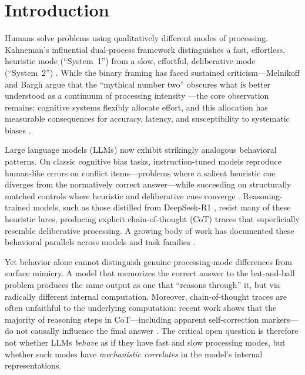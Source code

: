 
\section{Introduction}
\label{sec:introduction}

Humans solve problems using qualitatively different modes of processing.
Kahneman's influential dual-process framework distinguishes a fast, effortless,
heuristic mode (``System~1'') from a slow, effortful, deliberative mode
(``System~2'') \citep{kahneman2011thinking}.  While the binary framing has
faced sustained criticism---Melnikoff and Bargh argue that the ``mythical number
two'' obscures what is better understood as a continuum of processing intensity
\citep{melnikoff2018mythical}---the core observation remains: cognitive systems
flexibly allocate effort, and this allocation has measurable consequences for
accuracy, latency, and susceptibility to systematic biases
\citep{evans2013dual, deneys2012bias}.

Large language models (LLMs) now exhibit strikingly analogous behavioral
patterns.  On classic cognitive bias tasks, instruction-tuned models reproduce
human-like errors on conflict items---problems where a salient heuristic cue
diverges from the normatively correct answer---while succeeding on structurally
matched controls where heuristic and deliberative cues converge
\citep{hagendorff2023human}.  Reasoning-trained models, such as those distilled
from DeepSeek-R1 \citep{deepseekr1}, resist many of these heuristic lures,
producing explicit chain-of-thought (CoT) traces that superficially resemble
deliberative processing.  A growing body of work has documented these behavioral
parallels across models and task families \citep{xie2025cogsci, rao2024cobbler,
codaforno2025dual, ziabari2025reasoning}.

Yet behavior alone cannot distinguish genuine processing-mode differences from
surface mimicry.  A model that memorizes the correct answer to the bat-and-ball
problem produces the same output as one that ``reasons through'' it, but via
radically different internal computation.  Moreover, chain-of-thought traces are
often unfaithful to the underlying computation: recent work shows that the
majority of reasoning steps in CoT---including apparent self-correction
markers---do not causally influence the final answer
\citep{lanham2023measuring, jiang2025aha}.  The critical open question is
therefore not whether LLMs \emph{behave} as if they have fast and slow
processing modes, but whether such modes have \emph{mechanistic correlates} in
the model's internal representations.

